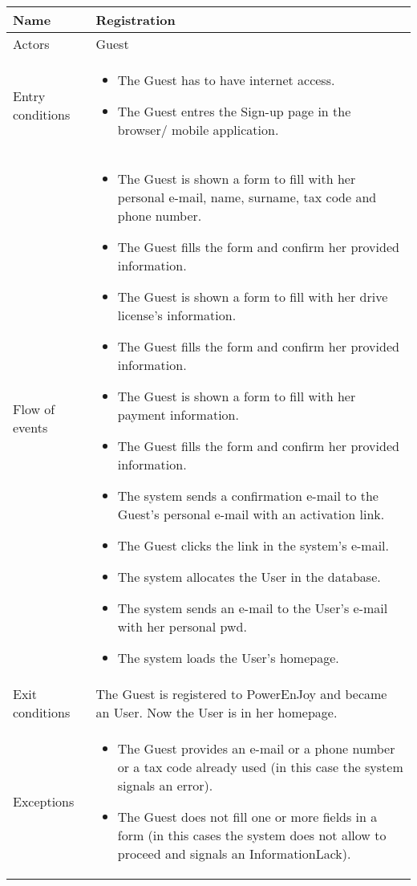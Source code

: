 \begin{center}
  \begin{tabular}{ l | p{12cm} }
    \hline
    \textbf{Name} & \textbf{Registration} \\ \hline
    Actors & Guest\\ \hline
    Entry conditions & 
\begin{itemize}
\item The Guest has to have internet access.
\item The Guest entres the Sign-up page in the browser/ mobile application. 
\end{itemize} \\ \hline
    Flow of events &
\begin{itemize}
\item The Guest is shown a form to fill with her personal e-mail, name, surname, tax code and phone number. %
\item The Guest fills the form and confirm her provided information.
\item The Guest is shown a form to fill with her drive license's information.
\item The Guest fills the form and confirm her provided information.
\item The Guest is shown a form to fill with her payment information.
\item The Guest fills the form and confirm her provided information.
\item The system sends a confirmation e-mail to the Guest's personal e-mail with an activation link.
\item The Guest clicks the link in the system's e-mail.
\item The system allocates the User in the database.
\item The system sends an e-mail to the User's e-mail with her personal \gls{pwd}.
\item The system loads the User's homepage.
\end{itemize} \\ \hline
  	Exit conditions & The Guest is registered to PowerEnJoy and became an User. Now the User is in her homepage. \\ \hline
	Exceptions & 
\begin{itemize}
\item The Guest provides an e-mail or a phone number or a tax code already used (in this case the system signals an error).
\item The Guest does not fill one or more fields in a form (in this cases the system does not allow to proceed and signals an InformationLack).

\end{itemize}
\end{tabular}
\end{center}
